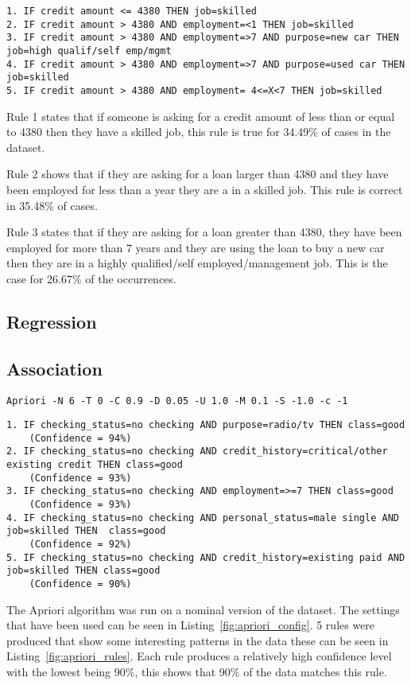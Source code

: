 \documentclass[12pt]{article}
\begin{document}
\begin{lstlisting}[caption="J48 rules"\label{fig:j48_rules}]
1. IF credit amount <= 4380 THEN job=skilled
2. IF credit amount > 4380 AND employment=<1 THEN job=skilled
3. IF credit amount > 4380 AND employment=>7 AND purpose=new car THEN job=high qualif/self emp/mgmt
4. IF credit amount > 4380 AND employment=>7 AND purpose=used car THEN job=skilled
5. IF credit amount > 4380 AND employment= 4<=X<7 THEN job=skilled
\end{lstlisting}

Rule 1 states that if someone is asking for a credit amount of less than or equal to 4380 then they have a skilled job, this rule is true for 34.49\% of cases in the dataset. 

Rule 2 shows that if they are asking for a loan larger than 4380 and they have been employed for less than a year they are a in a skilled job. This rule is correct in 35.48\% of cases.

Rule 3 states that if they are asking for a loan greater than 4380, they have been employed for more than 7 years and they are using the loan to buy a new car then they are in a highly qualified/self employed/management job. This is the case for 26.67\% of the occurrences.

\subsection{Regression}

\subsection{Association}

\begin{lstlisting}[caption="Apriori configuration"\label{fig:apriori_config}]
Apriori -N 6 -T 0 -C 0.9 -D 0.05 -U 1.0 -M 0.1 -S -1.0 -c -1
\end{lstlisting}
\begin{lstlisting}[caption="Apriori rules"\label{fig:apriori_rules}]
1. IF checking_status=no checking AND purpose=radio/tv THEN class=good 
    (Confidence = 94%)
2. IF checking_status=no checking AND credit_history=critical/other existing credit THEN class=good 
    (Confidence = 93%)
3. IF checking_status=no checking AND employment=>=7 THEN class=good 
    (Confidence = 93%)
4. IF checking_status=no checking AND personal_status=male single AND job=skilled THEN  class=good 
    (Confidence = 92%)
5. IF checking_status=no checking AND credit_history=existing paid AND job=skilled THEN class=good 
    (Confidence = 90%)

\end{lstlisting}
The Apriori algorithm was run on a nominal version of the dataset. The settings that have been used can be seen in Listing~\ref{fig:apriori_config}. 5 rules were produced that show some interesting patterns in the data these can be seen in Listing~\ref{fig:apriori_rules}. Each rule produces a relatively high confidence level with the lowest being 90\%, this shows that 90\% of the data matches this rule. 
\end{document}
